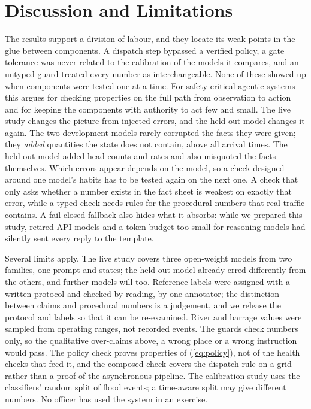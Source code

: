 \documentclass[conference]{IEEEtran}
\begin{document}
\section{Discussion and Limitations}
The results support a division of labour, and they locate its weak points in the glue between components. A dispatch step bypassed a verified policy, a gate tolerance was never related to the calibration of the models it compares, and an untyped guard treated every number as interchangeable. None of these showed up when components were tested one at a time. For safety-critical agentic systems this argues for checking properties on the full path from observation to action and for keeping the components with authority to act few and small. The live study changes the picture from injected errors, and the held-out model changes it again. The two development models rarely corrupted the facts they were given; they \emph{added} quantities the state does not contain, above all arrival times. The held-out model added head-counts and rates and also misquoted the facts themselves. Which errors appear depends on the model, so a check designed around one model's habits has to be tested again on the next one. A check that only asks whether a number exists in the fact sheet is weakest on exactly that error, while a typed check needs rules for the procedural numbers that real traffic contains. A fail-closed fallback also hides what it absorbs: while we prepared this study, retired API models and a token budget too small for reasoning models had silently sent every reply to the template.

Several limits apply. The live study covers three open-weight models from two families, one prompt and \LiveStates{} states; the held-out model already erred differently from the others, and further models will too. Reference labels were assigned with a written protocol and checked by reading, by one annotator; the distinction between claims and procedural numbers is a judgement, and we release the protocol and labels so that it can be re-examined. River and barrage values were sampled from operating ranges, not recorded events. The guards check numbers only, so the qualitative over-claims above, a wrong place or a wrong instruction would pass. The policy check proves properties of (\ref{eq:policy}), not of the health checks that feed it, and the composed check covers the dispatch rule on a grid rather than a proof of the asynchronous pipeline. The calibration study uses the classifiers' random split of flood events; a time-aware split may give different numbers. No officer has used the system in an exercise.
\end{document}
